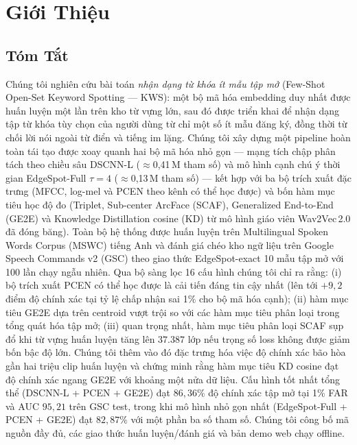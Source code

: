 \documentclass[12pt,a4paper]{report}
\begin{document}
\chapter{Giới Thiệu}\label{ch:intro}

\section{Tóm Tắt}\label{sec:abstract}

Chúng tôi nghiên cứu bài toán \emph{nhận dạng từ khóa ít mẫu tập mở} (Few-Shot
Open-Set Keyword Spotting --- KWS): một bộ mã hóa embedding duy nhất được huấn
luyện một lần trên kho từ vựng lớn, sau đó được triển khai để nhận dạng tập từ
khóa tùy chọn của người dùng từ chỉ một số ít mẫu đăng ký, đồng thời từ chối
lời nói ngoài từ điển và tiếng im lặng. Chúng tôi xây dựng một pipeline hoàn
toàn tái tạo được xoay quanh hai bộ mã hóa nhỏ gọn --- mạng tích chập phân tách
theo chiều sâu DSCNN-L ($\approx$0{,}41\,M tham số) và mô hình cạnh chú ý thời gian
EdgeSpot-Full $\tau{=}4$ ($\approx$0{,}13\,M tham số) --- kết hợp với ba bộ trích
xuất đặc trưng (MFCC, log-mel và PCEN theo kênh có thể học được) và bốn hàm mục
tiêu học độ đo (Triplet, Sub-center ArcFace (SCAF), Generalized End-to-End (GE2E)
và Knowledge Distillation cosine (KD) từ mô hình giáo viên Wav2Vec\,2.0 đã đóng
băng). Toàn bộ hệ thống được huấn luyện trên Multilingual Spoken Words Corpus
(MSWC) tiếng Anh và đánh giá chéo kho ngữ liệu trên Google Speech Commands v2
(GSC) theo giao thức EdgeSpot-exact 10 mẫu tập mở với 100 lần chạy ngẫu nhiên.
Qua bộ sàng lọc 16 cấu hình chúng tôi chỉ ra rằng:
(i) bộ trích xuất PCEN có thể học được là cải tiến đáng tin cậy nhất (lên tới
$+9{,}2$ điểm độ chính xác tại tỷ lệ chấp nhận sai 1\% cho bộ mã hóa cạnh);
(ii) hàm mục tiêu GE2E dựa trên centroid vượt trội so với các hàm mục tiêu phân
loại trong tổng quát hóa tập mở;
(iii) quan trọng nhất, hàm mục tiêu phân loại SCAF sụp đổ khi từ vựng huấn luyện
tăng lên $37{.}387$ lớp nếu trọng số loss không được giảm bốn bậc độ lớn.
Chúng tôi thêm vào đó đặc trưng hóa việc độ chính xác bão hòa gần hai triệu
clip huấn luyện và chứng minh rằng hàm mục tiêu KD cosine đạt độ chính xác ngang
GE2E với khoảng một nửa dữ liệu. Cấu hình tốt nhất tổng thể (DSCNN-L + PCEN +
GE2E) đạt $86{,}36\%$ độ chính xác tập mở tại 1\% FAR và AUC $95{,}21$ trên GSC
test, trong khi mô hình nhỏ gọn nhất (EdgeSpot-Full + PCEN + GE2E) đạt $82{,}87\%$
với một phần ba số tham số. Chúng tôi công bố mã nguồn đầy đủ, các giao thức
huấn luyện/đánh giá và bản demo web chạy offline.
\end{document}
